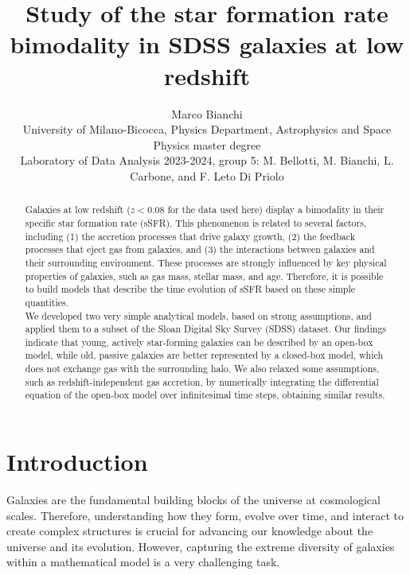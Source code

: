 \documentclass[fleqn,usenatbib]{mnras}
\title[Short title, max. 45 characters]{Study of the star formation rate bimodality in SDSS galaxies at low redshift}
\author[M. Bianchi]{
Marco Bianchi
\\
University of Milano-Bicocca, Physics Department, Astrophysics and Space Physics master degree\\
Laboratory of Data Analysis 2023-2024, group 5: M. Bellotti, M. Bianchi, L. Carbone, and F. Leto Di Priolo
}
\begin{document}
\label{firstpage}
\pagerange{\pageref{firstpage}--\pageref{lastpage}}
\maketitle

\begin{abstract}
Galaxies at low redshift ($z<0.08$ for the data used here) display a bimodality in their specific star formation rate (sSFR). This phenomenon is related to several factors, including (1) the accretion processes that drive galaxy growth, (2) the feedback processes that eject gas from galaxies, and (3) the interactions between galaxies and their surrounding environment. These processes are strongly influenced by key physical properties of galaxies, such as gas mass, stellar mass, and age. Therefore, it is possible to build models that describe the time evolution of sSFR based on these simple quantities. \\
We developed two very simple analytical models, based on strong assumptions, and applied them to a subset of the Sloan Digital Sky Survey (SDSS) dataset. Our findings indicate that young, actively star-forming galaxies can be described by an open-box model, while old, passive galaxies are better represented by a closed-box model, which does not exchange gas with the surrounding halo. We also relaxed some assumptions, such as redshift-independent gas accretion, by numerically integrating the differential equation of the open-box model over infinitesimal time steps, obtaining similar results.
\bigskip
\end{abstract} 





\section{Introduction}\label{sec:introduction}
Galaxies are the fundamental building blocks of the universe at cosmological scales. Therefore, understanding how they form, evolve over time, and interact to create complex structures is crucial for advancing our knowledge about the universe and its evolution. However, capturing the extreme diversity of galaxies within a mathematical model is a very challenging task.
\end{document}
